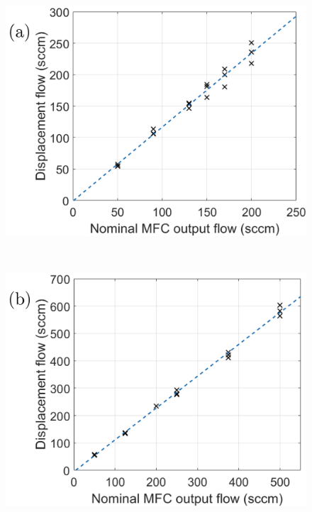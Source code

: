 \documentclass[
  a4paper,
]{scrbook}
\begin{document}
\begin{figure}

\begin{minipage}[t]{0.47\linewidth}

{\centering 

\includegraphics{figures/ch5/200sccmMFC_carrierline_thruchamber_edited.png}
{}

}

\end{minipage}%
%
\begin{minipage}[t]{0.05\linewidth}

{\centering 

~

}

\end{minipage}%
%
\begin{minipage}[t]{0.47\linewidth}

{\centering 

\includegraphics{figures/ch5/500sccmMFC_dilutionline_thruchamber_edited.png}
{}

}
\end{minipage}
\end{figure}
\end{document}
